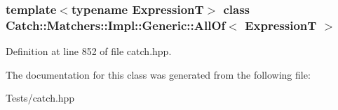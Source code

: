 \subsubsection*{template$<$typename ExpressionT$>$\newline
class Catch\+::\+Matchers\+::\+Impl\+::\+Generic\+::\+All\+Of$<$ Expression\+T $>$}



Definition at line 852 of file catch.\+hpp.



The documentation for this class was generated from the following file\+:\begin{DoxyCompactItemize}
\item 
Tests/catch.\+hpp\end{DoxyCompactItemize}
